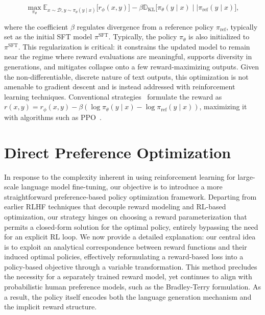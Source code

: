 \begin{equation}\label{eq:RL}
\max_{\pi_{\theta}}  \mathbb{E}_{x\sim \mathcal{D}, y\sim \pi_{\theta}(y \mid x)}\bigl[r_{\phi}(x, y)\bigr] - \beta\mathbb{D}_{\textrm{KL}}\bigl[\pi_{\theta}(y\mid x)\mid \mid \pi_\text{ref}(y\mid x)\bigr],
\end{equation}

where the coefficient $\beta$ regulates divergence from a reference policy $\pi_\text{ref}$, typically set as the initial SFT model $\pi^\text{SFT}$. 
Typically, the policy $\pi_\theta$ is also initialized to $\pi^\text{SFT}$. This regularization is critical: it constrains the updated model to remain near the regime where reward evaluations are meaningful, supports diversity in generations, and mitigates collapse onto a few reward-maximizing outputs. Given the non-differentiable, discrete nature of text outputs, this optimization is not amenable to gradient descent and is instead addressed with reinforcement learning techniques. Conventional strategies~\citep{ziegler2020finetuning, stiennon2022learning, bai2022training, ouyang2022training} formulate the reward as ${r(x, y) = r_{\phi}(x, y) -\beta (\log \pi_{\theta}(y\mid x) - \log \pi_\text{ref}(y\mid x))}$, maximizing it with algorithms such as PPO~\cite{schulman2017proximal}.

\section{Direct Preference Optimization}\label{sec:DPO}

In response to the complexity inherent in using reinforcement learning for large-scale language model fine-tuning, our objective is to introduce a more straightforward preference-based policy optimization framework. Departing from earlier RLHF techniques that decouple reward modeling and RL-based optimization, our strategy hinges on choosing a reward parameterization that permits a closed-form solution for the optimal policy, entirely bypassing the need for an explicit RL loop. We now provide a detailed explanation: our central idea is to exploit an analytical correspondence between reward functions and their induced optimal policies, effectively reformulating a reward-based loss into a policy-based objective through a variable transformation. This method precludes the necessity for a separately trained reward model, yet continues to align with probabilistic human preference models, such as the Bradley-Terry formulation. As a result, the policy itself encodes both the language generation mechanism and the implicit reward structure.

